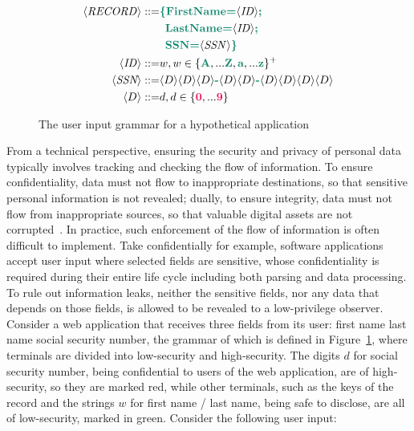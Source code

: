 \begin{figure}[tbp]
  \small
  \begin{align*}
    \langle \mathit{RECORD} \rangle ::= & {\color{green} \textbf{\{FirstName=}} \langle \mathit{ID} \rangle {\color{green} \textbf{;}} \\
                               & \enspace {\color{green} \textbf{LastName=}} \langle \mathit{ID} \rangle {\color{green} \textbf{;}} \\
                               & \enspace {\color{green} \textbf{SSN=}} \langle \mathit{SSN} \rangle {\color{green} \textbf{\}}} \\
    \langle \mathit{ID} \rangle     ::= & w , w \in \{ {\color{green} \textbf{A}}, ... {\color{green} \textbf{Z}}, {\color{green} \textbf{a}}, ... {\color{green} \textbf{z}} \}^{+} \\
    \langle \textit{SSN} \rangle    ::= & \langle D \rangle \langle D \rangle \langle D \rangle {\color{green} \textbf{-}}
                                 \langle D \rangle \langle D \rangle {\color{green} \textbf{-}}
                                 \langle D \rangle \langle D \rangle \langle D \rangle \langle D \rangle \\
    \langle D \rangle      ::= & d , d \in \{ {\color{red} \textbf{0}}, ... {\color{red} \textbf{9}} \}
  \end{align*}
  \caption{The user input grammar for a hypothetical application}
  \label{fig:grammar}
\end{figure}

From a technical perspective, ensuring the security and privacy of personal data
typically involves tracking and checking the flow of information. To ensure
confidentiality, data must not flow to inappropriate destinations, so that
sensitive personal information is not revealed; dually, to ensure integrity,
data must not flow from inappropriate sources, so that valuable digital assets
are not corrupted~\cite{sabelfeld2003language,biba1977integrity}. In practice,
such enforcement of the flow of information is often difficult to implement.
Take confidentially for example, software applications accept user input where
selected fields are sensitive, whose confidentiality is required during their
entire life cycle including both parsing and data processing. To rule out
information leaks, neither the sensitive fields, nor any data that depends on
those fields, is allowed to be revealed to a low-privilege observer. Consider a
web application that receives three fields from its user:  first name
 last name  social security number, the grammar of which
is defined in Figure~\ref{fig:grammar}, where terminals are divided into
low-security and high-security. The digits $d$ for social security number, being
confidential to users of the web application, are of high-security, so they are
marked {\color{red} red}, while other terminals, such as the keys of the record
and the strings $w$ for first name / last name, being safe to disclose, are all
of low-security, marked in {\color{green} green}. Consider the following user
input:

